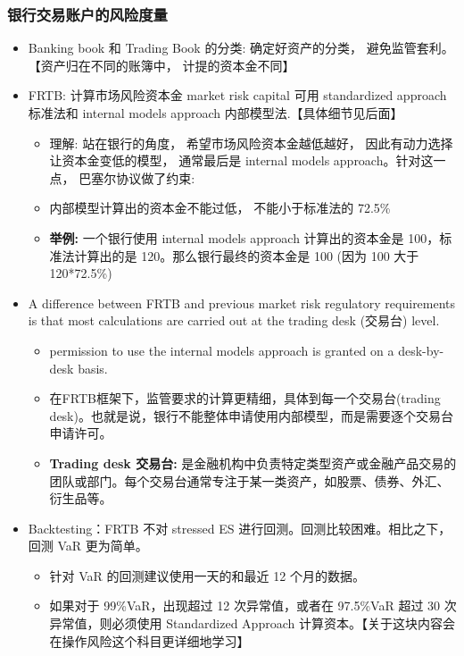 \subsubsection{银行交易账户的风险度量}

\begin{itemize}
\item Banking book 和 Trading Book 的分类: 确定好资产的分类， 避免监管套利。 【资产归在不同的账簿中， 计提的资本金不同】

\item FRTB: 计算市场风险资本金 market risk capital 可用 standardized approach 标准法和 internal models approach 内部模型法.【具体细节见后面】
    \begin{itemize}
    \item 理解: 站在银行的角度， 希望市场风险资本金越低越好， 因此有动力选择让资本金变低的模型， 通常最后是 internal models approach。针对这一点， 巴塞尔协议做了约束:
    \item 内部模型计算出的资本金不能过低， 不能小于标准法的 72.5\%
    \item \textbf{举例:} 一个银行使用 internal models approach 计算出的资本金是 100，标准法计算出的是 120。那么银行最终的资本金是 100 (因为 100 大于 120*72.5\%)
    \end{itemize}
\item A difference between FRTB and previous market risk regulatory requirements is that most calculations are carried out at the trading desk (交易台) level.
  \begin{itemize}
    \item permission to use the internal models approach is granted on a desk-by-desk basis.
    \item 在FRTB框架下，监管要求的计算更精细，具体到每一个交易台(trading desk)。也就是说，银行不能整体申请使用内部模型，而是需要逐个交易台申请许可。
    \item \textbf{Trading desk 交易台:} 是金融机构中负责特定类型资产或金融产品交易的团队或部门。每个交易台通常专注于某一类资产，如股票、债券、外汇、衍生品等。
    \end{itemize}

\item Backtesting：FRTB 不对 stressed ES 进行回测。回测比较困难。相比之下，回测 VaR 更为简单。
  \begin{itemize}
    \item 针对 VaR 的回测建议使用一天的和最近 12 个月的数据。
    \item 如果对于 99\%VaR，出现超过 12 次异常值，或者在 97.5\%VaR 超过 30 次异常值，则必须使用 Standardized Approach 计算资本。【关于这块内容会在操作风险这个科目更详细地学习】
  \end{itemize}


\end{itemize}
